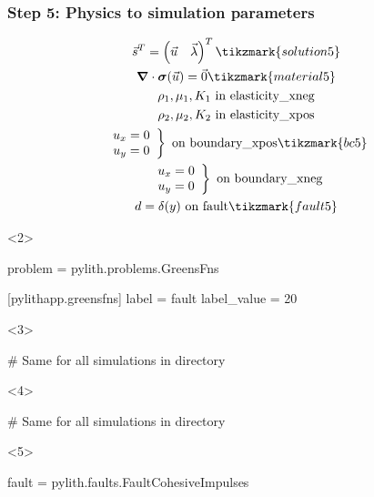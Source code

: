 \documentclass[aspectratio=169]{beamer}
\begin{document}
\begin{frame}[t,fragile]
  \frametitle{Step 5: Physics to simulation parameters}
  \summary{}

  \begin{minipage}[t]{0.35\textwidth}
    {\scriptsize
    \begin{gather*}
    \vec{s}^T = \left( \vec{u} \quad \vec{\lambda} \right)^T \tikzmark{solution5}\\
    \tensor{\nabla} \cdot \tensor{\sigma}(\vec{u}) = \vec{0} \tikzmark{material5} \\
    \rho_1, \mu_1, K_1 \text{ in elasticity\_xneg} \\ 
    \rho_2, \mu_2, K_2 \text{ in elasticity\_xpos} \\ 
    \left. \begin{array}{c} u_x = 0 \\ u_y = 0 \end{array}\right\} \text{ on boundary\_xpos} \tikzmark{bc5}\\
    \left. \begin{array}{c} u_x = 0 \\ u_y = 0 \end{array}\right\} \text{ on boundary\_xneg} \\
    d = \delta(y) \text{ on fault} \tikzmark{fault5}
    \end{gather*}}
  \end{minipage}
  \hfill
  \begin{minipage}[t]{0.60\textwidth}
    \begin{onlyenv}<2>
      \begin{cfgcode}
        [pylithapp]
        problem = pylith.problems.GreensFns

        [pylithapp.greensfns]
        label = fault
        label_value = 20
      \end{cfgcode}
    \end{onlyenv}
    \begin{onlyenv}<3>
      \begin{cfgcode}
        # Same for all simulations in directory
      \end{cfgcode}
    \end{onlyenv}
    \begin{onlyenv}<4>
      \begin{cfgcode}
        # Same for all simulations in directory
      \end{cfgcode}
    \end{onlyenv}
    \begin{onlyenv}<5>
      \begin{cfgcode}
        fault = pylith.faults.FaultCohesiveImpulses


\end{cfgcode}
\end{onlyenv}
\end{minipage}
\end{frame}
\end{document}
